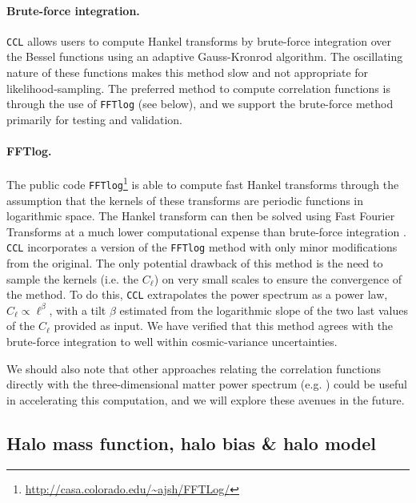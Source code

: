\documentclass[\docopts]{\docclass}
\newcommand{\ccl}{{\tt CCL}\xspace}
\begin{document}
\paragraph{\bf Brute-force integration.} \ccl allows users to compute Hankel transforms by brute-force integration over the Bessel functions using an adaptive Gauss-Kronrod algorithm. The oscillating nature of these functions makes this method slow and not appropriate for likelihood-sampling. The preferred method to compute correlation functions is through the use of {\tt FFTlog} (see below), and we support the brute-force method primarily for testing and validation.

\paragraph{\bf FFTlog.} The public code {\tt FFTlog}\footnote{\url{http://casa.colorado.edu/~ajsh/FFTLog/}} is able to compute fast Hankel transforms through the assumption that the kernels of these transforms are periodic functions in logarithmic space. The Hankel transform can then be solved using Fast Fourier Transforms at a much lower computational expense than brute-force integration \citep{Hamilton2000,Talman2009}. \ccl incorporates a version of the {\tt FFTlog} method with only minor modifications from the original. The only potential drawback of this method is the need to sample the kernels (i.e. the $C_\ell$) on very small scales to ensure the convergence of the method. To do this, \ccl extrapolates the power spectrum as a power law, $C_\ell\propto\ell^\beta$, with a tilt $\beta$ estimated from the logarithmic slope of the two last values of the $C_\ell$ provided as input. We have verified that this method agrees with the brute-force integration to well within cosmic-variance uncertainties.

We should also note that other approaches relating the correlation functions directly with the three-dimensional matter power spectrum (e.g. \citealt{2017ApJ...845...28C}) could be useful in accelerating this computation, and we will explore these avenues in the future.


\subsection{Halo mass function, halo bias \& halo model}
\end{document}
